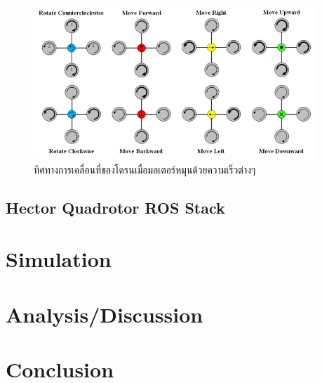 \documentclass{classes/fiboReport}
\begin{document}
\begin{figure}[!ht]
	\centering
	\includegraphics[width=0.95\textwidth]{images/Quadcopter_Movement.png}
	\caption{ทิศทางการเคลื่อนที่ของโดรนเมื่อมอเตอร์หมุนด้วยความเร็วต่างๆ}
	\label{fig:quadroter_movement}
\end{figure}









\clearpage
\section{Hector Quadrotor ROS Stack}



\chapter{Simulation}





\chapter{Analysis/Discussion}
\chapter{Conclusion}


\nocite{*}


\end{document}
